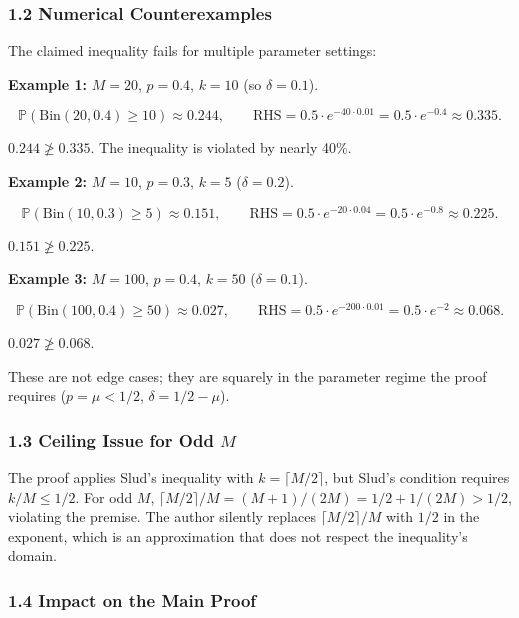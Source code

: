 \documentclass[
  12pt,
]{ctexart}
\begin{document}
\subsubsection{1.2 Numerical
Counterexamples}\label{numerical-counterexamples}

The claimed inequality fails for multiple parameter settings:

\textbf{Example 1:} \(M=20\), \(p=0.4\), \(k=10\) (so \(\delta=0.1\)).

\[\mathbb{P}(\text{Bin}(20,0.4) \geq 10) \approx 0.244, \qquad \text{RHS} = 0.5\cdot e^{-40\cdot 0.01} = 0.5\cdot e^{-0.4} \approx 0.335.\]

\(0.244 \not\geq 0.335\). The inequality is violated by nearly 40\%.

\textbf{Example 2:} \(M=10\), \(p=0.3\), \(k=5\) (\(\delta=0.2\)).

\[\mathbb{P}(\text{Bin}(10,0.3) \geq 5) \approx 0.151, \qquad \text{RHS} = 0.5\cdot e^{-20\cdot 0.04}=0.5\cdot e^{-0.8} \approx 0.225.\]

\(0.151 \not\geq 0.225\).

\textbf{Example 3:} \(M=100\), \(p=0.4\), \(k=50\) (\(\delta=0.1\)).

\[\mathbb{P}(\text{Bin}(100,0.4) \geq 50) \approx 0.027, \qquad \text{RHS} = 0.5\cdot e^{-200\cdot 0.01}=0.5\cdot e^{-2} \approx 0.068.\]

\(0.027 \not\geq 0.068\).

These are not edge cases; they are squarely in the parameter regime the
proof requires (\(p=\mu<1/2\), \(\delta=1/2-\mu\)).

\subsubsection{\texorpdfstring{1.3 Ceiling Issue for Odd
\(M\)}{1.3 Ceiling Issue for Odd M}}\label{ceiling-issue-for-odd-m}

The proof applies Slud's inequality with \(k = \lceil M/2\rceil\), but
Slud's condition requires \(k/M \leq 1/2\). For odd \(M\),
\(\lceil M/2\rceil/M = (M+1)/(2M) = 1/2 + 1/(2M) > 1/2\), violating the
premise. The author silently replaces \(\lceil M/2\rceil/M\) with
\(1/2\) in the exponent, which is an approximation that does not respect
the inequality's domain.

\subsubsection{1.4 Impact on the Main
Proof}\label{impact-on-the-main-proof}
\end{document}
